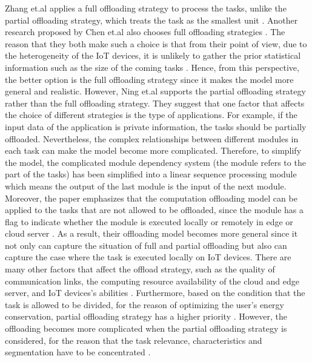 \documentclass[a4paper,11pt]{article}
\begin{document}
Zhang et.al applies a full offloading strategy to process the tasks, unlike the partial offloading strategy, which treats the task as the smallest unit \cite{no_cloud_1_density}. Another research proposed by Chen et.al also chooses full offloading strategies \cite{full_offload_2}. The reason that they both make such a choice is that from their point of view, due to the heterogeneity of the IoT devices, it is unlikely to gather the prior statistical information such as the size of the coming tasks \cite{no_cloud_1_density,full_offload_2}. Hence, from this perspective, the better option is the full offloading strategy since it makes the model more general and realistic. %
\newline\newline
However, Ning et.al supports the partial offloading strategy rather than the full offloading strategy. They suggest that one factor that affects the choice of different strategies is the type of applications. For example, if the input data of the application is private information, the tasks should be partially offloaded. Nevertheless, the complex relationships between different modules in each task can make the model become more complicated. Therefore, to simplify the model, the complicated module dependency system (the module refers to the part of the tasks) has been simplified into a linear sequence processing module which means the output of the last module is the input of the next module. Moreover, the paper emphasizes that the computation offloading model can be applied to the tasks that are not allowed to be offloaded, since the module has a flag to indicate whether the module is executed locally or remotely in edge or cloud server \cite{A_Cooperative_Partial_Computation_Offloading_Scheme_for_Mobile_Edge}. As a result, their offloading model becomes more general since it not only can capture the situation of full and partial offloading but also can capture the case where the task is executed locally on IoT devices.
\newline\newline
There are many other factors that affect the offload strategy, such as the quality of communication links, the computing resource availability of the cloud and edge server, and IoT devices's abilities \cite{A_Cooperative_Partial_Computation_Offloading_Scheme_for_Mobile_Edge}. Furthermore, based on the condition that the task is allowed to be divided, for the reason of optimizing the user's energy conservation, partial offloading strategy has a higher priority \cite{save_energy}. However, the offloading becomes more complicated when the partial offloading strategy is considered, for the reason that the task relevance, characteristics and segmentation have to be concentrated \cite{user_central}. \newline
\end{document}
